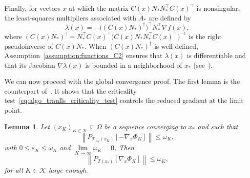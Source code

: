 \documentclass[pdflatex,sn-mathphys-num]{sn-jnl}%
\theoremstyle{thmstyleone}%
\newtheorem{lemma}[theorem]{Lemma}
\newcommand{\calK}{{\mathcal{K}}}
\newcommand{\calT}{{\mathcal{T}}}
\newcommand{\proj}[2]{P_{#1} \left[ {#2} \right]} %
\begin{document}
Finally, for vectors $x$ at which the matrix $C(x)N_* N_*^\top C(x)^\top$ is nonsingular, the least-squares multipliers associated with $\tilde A_*$ are defined by
\begin{equation}\label{eq:least-squares_mult}
	\lambda(x) = -\big((C(x)N_*)^\dagger\big)^\top N_*^\top\nabla f(x),
\end{equation}
where $(C(x)N_*)^\dagger = N_*^\top C(x)^\top\big(C(x)N_* N_*^\top C(x)^\top\big)^{-1}$ is the right pseudoinverse of $C(x)N_*$. When $(C(x)N_*)^\dagger $ is well defined, Assumption~\ref{assumption:functions_C2} ensures that $\lambda(x)$ is differentiable and that its Jacobian $\nabla\lambda(x)$ is bounded in a neighborhood of $x_*$ (see~\cite[Lemma~2.1]{conn-etal:1996b}).

We can now proceed with the global convergence proof. The first lemma is the counterpart of~\cite[Lemma~4.1]{conn-etal:1996b}. It shows that the criticality test~\eqref{eq:algo_traulls_criticality_test} controls the reduced gradient at the limit point.
\begin{lemma}\label{lemma:bound_proj_algrad_sol_nullspace}
	Let $\left(x_K\right)_{K\in \calK} \subseteq \Omega$ be a sequence converging to $x_*$ and such that
	\[\left\| \proj{\calT_{\varepsilon_K}(x_K)}{-\nabla_x \Phi_K} \right\| \le \omega_K,\]
	with $0 \le \varepsilon_K \le \omega_K$ and $\lim\limits_{K\to \infty} \omega_K = 0$. Then
	\begin{equation*}
		\left\| \proj{T(x_*)}{\nabla_x \Phi_K} \right\| \le  \omega_K,
	\end{equation*}
	for all $K\in \calK$ large enough.
\end{lemma}
\end{document}
